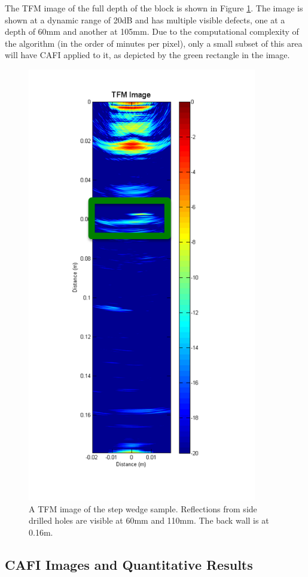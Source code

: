 The TFM image of the full depth of the block is shown in Figure \ref{fig:cafi_full_siemens}. The image is shown at a dynamic range of 20dB and has multiple visible defects, one at a depth of 60mm and another at 105mm. Due to the computational complexity of the algorithm (in the order of minutes per pixel), only a small subset of this area will have CAFI applied to it, as depicted by the green rectangle in the image.


\begin{figure}[hp]
\centering
		\includegraphics[width=100mm]{full_image.png}
		\caption{A TFM image of the step wedge sample. Reflections from side drilled holes are visible at 60mm and 110mm. The back wall is at 0.16m.}
		\label{fig:cafi_full_siemens}
\end{figure}

\subsection{CAFI Images and Quantitative Results}


